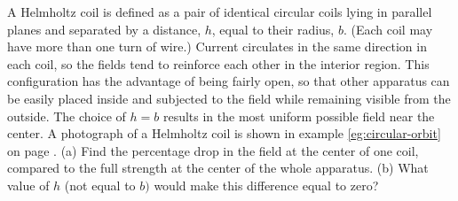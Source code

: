 A Helmholtz coil is defined as a pair of identical
circular coils lying in parallel planes and
separated by a distance, $h$, equal to their
radius, $b$. (Each coil may have more than one turn of
wire.) Current circulates in the same direction in each
coil, so the fields tend to reinforce each other in the
interior region. This configuration has the advantage of
being fairly open, so that other apparatus can be easily
placed inside and subjected to the field while remaining
visible from the outside. The choice of $h=b$ results in the
most uniform possible field near the center. A photograph of a Helmholtz coil
is shown in example \ref{eg:circular-orbit} on page \pageref{eg:circular-orbit}.\hwendpart
(a) Find the
percentage drop in the field at the center of one coil,
compared to the full strength at the center of the whole
apparatus. \answercheck\hwendpart
(b) What value of $h$ (not equal to $b)$ would
make this difference equal to zero?\answercheck
